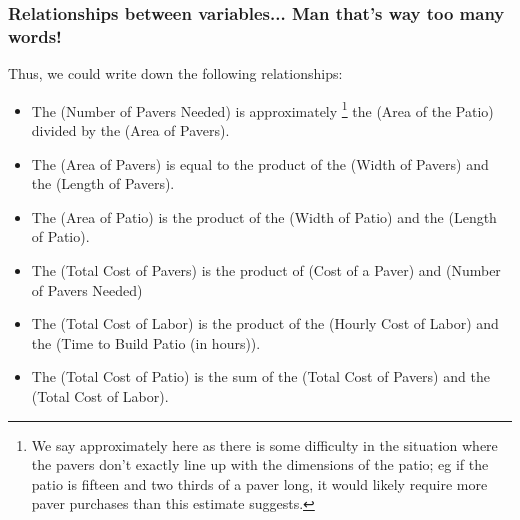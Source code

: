 \documentclass{ximera}
\begin{document}
\subsubsection*{Relationships between variables... Man that's way too many words!}
Thus, we could write down the following relationships:
\begin{itemize}
    \item The (Number of Pavers Needed) is approximately%
    \footnote{We say approximately here as there is some difficulty in the situation where the pavers don't exactly line up with the dimensions of the patio; eg if the patio is fifteen and two thirds of a paver long, it would likely require more paver purchases than this estimate suggests.}
    the (Area of the Patio) divided by the (Area of Pavers).
    \item The (Area of Pavers) is equal to the product of the (Width of Pavers) and the (Length of Pavers).
    \item The (Area of Patio) is the product of the (Width of Patio) and the (Length of Patio).
    \item The (Total Cost of Pavers) is the product of (Cost of a Paver) and (Number of Pavers Needed)
    \item The (Total Cost of Labor) is the product of the (Hourly Cost of Labor) and the (Time to Build Patio (in hours)).
    \item The (Total Cost of Patio) is the sum of the (Total Cost of Pavers) and the (Total Cost of Labor).
\end{itemize}
\end{document}
